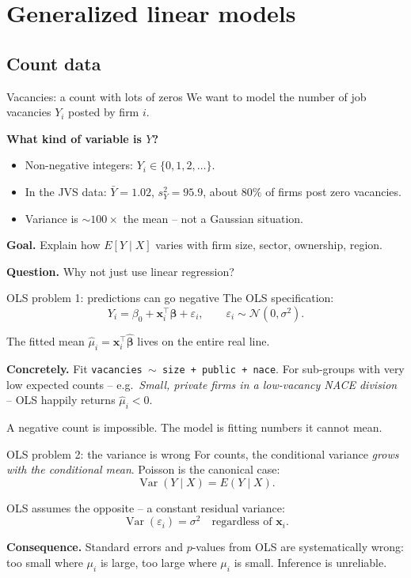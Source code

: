 \documentclass[10pt,ignorenonframetext,aspectratio=169]{beamer}
\begin{document}
\section{Generalized linear models}

\subsection{Count data}

\begin{frame}{Vacancies: a count with lots of zeros}
We want to model the number of job vacancies $Y_i$ posted by firm $i$.

\medskip
\textbf{What kind of variable is $Y$?}
\begin{itemize}
    \justifying
    \item Non-negative integers: $Y_i \in \{0, 1, 2, \ldots\}$.
    \item In the JVS data: $\bar{Y} = 1.02$, \quad $s_Y^2 = 95.9$, \quad about $80\%$ of firms post zero vacancies.
    \item Variance is $\sim 100\times$ the mean -- not a Gaussian situation.
\end{itemize}

\medskip
\textbf{Goal.} Explain how $E[Y \mid X]$ varies with firm size, sector, ownership, region.

\medskip
\textbf{Question.} Why not just use linear regression?
\end{frame}


\begin{frame}{OLS problem 1: predictions can go negative}
The OLS specification:
\[
Y_i = \beta_0 + \mathbf{x}_i^\top\boldsymbol{\beta} + \varepsilon_i, \qquad \varepsilon_i \sim \mathcal{N}(0,\sigma^2).
\]

\medskip
The fitted mean $\hat{\mu}_i = \mathbf{x}_i^\top\hat{\boldsymbol{\beta}}$ lives on the entire real line.

\medskip
\textbf{Concretely.} Fit \texttt{vacancies $\sim$ size + public + nace}. For sub-groups with very low expected counts -- e.g.\ \emph{Small, private firms in a low-vacancy NACE division} -- OLS happily returns $\hat{\mu}_i < 0$.

\medskip
\alert{A negative count is impossible.} The model is fitting numbers it cannot mean.
\end{frame}


\begin{frame}{OLS problem 2: the variance is wrong}
For counts, the conditional variance \emph{grows with the conditional mean}. Poisson is the canonical case:
\[
\operatorname{Var}(Y \mid X) = E(Y \mid X).
\]

\medskip
OLS assumes the opposite -- a constant residual variance:
\[
\operatorname{Var}(\varepsilon_i) = \sigma^2 \quad \text{regardless of } \mathbf{x}_i.
\]

\medskip
\textbf{Consequence.} Standard errors and $p$-values from OLS are systematically wrong: too small where $\mu_i$ is large, too large where $\mu_i$ is small. Inference is unreliable.
\end{frame}
\end{document}
